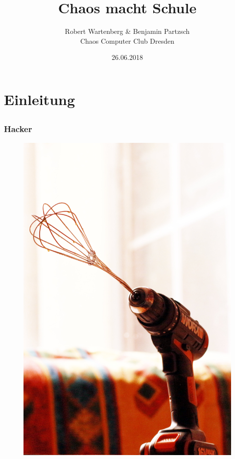 \documentclass[12pt]{beamer}
\title{Chaos macht Schule}
\author{\small Robert Wartenberg \& Benjamin Partzsch\\\large Chaos Computer Club Dresden}
\date{26.06.2018}
\begin{document}
\maketitle

\section{Einleitung}
\subsection{}


\begin{frame}
  \frametitle{Hacker}
  \begin{figure}
    \includegraphics[height=0.7\textheight]{img/schneeschrauber.jpg}
  \end{figure}
\end{frame}
\end{document}
